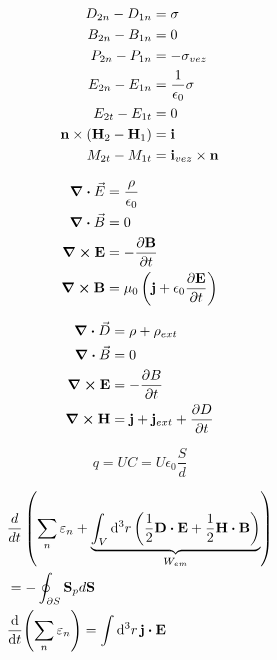\documentclass[11pt,twoside]{article}
\begin{document}
\begin{multicols}{3}
\begin{footnotesize}
\begin{equation}
\begin{split}
D_{2n} - D_{1n} &= \sigma \\
B_{2n} - B_{1n} &= 0 \\
P_{2n} - P_{1n} &= -\sigma_{vez} \\
E_{2n} - E_{1n} &= \frac{1}{\epsilon_0} \sigma \\
E_{2t} - E_{1t} &= 0 \\
\vb{n}\times (\vb{H}_2 - \vb{H}_1) &= \vb{i} \\
M_{2t} - M_{1t} &= \vb{i}_{vez} \times \vb{n}
\end{split}
\end{equation}

\begin{equation}
\begin{split}
\div\vec{E} &= \frac{\rho}{\epsilon_0} \\
\div\vec{B} &= 0 \\
\curl \vb{E} &= -\frac{\partial\vb{B}}{\partial t} \\
\curl \vb{B} &= \mu_0 \left( \vb{j} + \epsilon_0 \frac{\partial\vb{E}}{\partial t} \right)
\end{split}
\end{equation}

\begin{equation}
\begin{split}
\div\vec{D} &= \rho + \rho_{ext} \\
\div\vec{B} &= 0 \\
\curl \vb{E} &= - \frac{\partial B}{\partial t} \\
\curl \vb{H} &= \vb{j} + \vb{j}_{ext} + \frac{\partial D}{\partial t}
\end{split}
\end{equation}

\begin{equation}
q = U C = U \epsilon_0 \frac{S}{d}
\end{equation}

\begin{equation}
\begin{split}
&\frac{d}{dt} \left( \sum_n \varepsilon_n + \underbrace{\int_V \dd[3]{r} \left( \frac{1}{2} \vb{D}\vdot\vb{E} + \frac{1}{2}\vb{H}\vdot\vb{B} \right)}_{W_{em}} \right) \\ &= -\oint_{\partial S} \vb{S}_p d\vb{S} \\
&\dv{t} (\sum_n \varepsilon_n ) = \int \dd[3]{r}\vb{j}\vdot\vb{E}
\end{split}
\end{equation}


\end{footnotesize}
\end{multicols}
\end{document}
